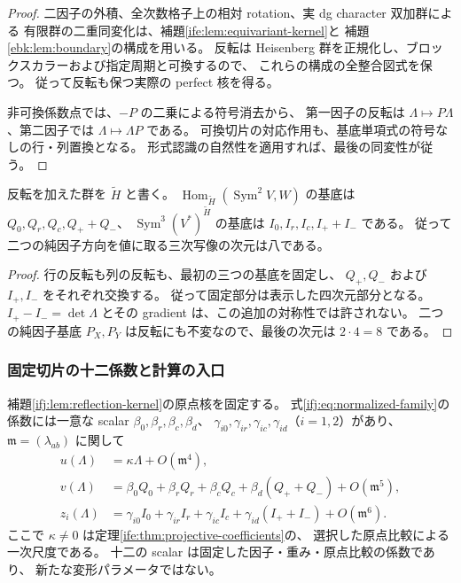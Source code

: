 \begin{proof}
二因子の外積、全次数格子上の相対 rotation、実 dg character 双加群による
有限群の二重同変化は、補題\ref{ife:lem:equivariant-kernel}と
補題\ref{ebk:lem:boundary}の構成を用いる。
反転は Heisenberg 群を正規化し、ブロックスカラーおよび指定周期と可換するので、
これらの構成の全整合図式を保つ。
従って反転も保つ実際の perfect 核を得る。

非可換係数点では、$-P$ の二乗による符号消去から、
第一因子の反転は $\Lambda\mapsto P\Lambda$、第二因子では
$\Lambda\mapsto\Lambda P$ である。
可換切片の対応作用も、基底単項式の符号なしの行・列置換となる。
形式認識の自然性を適用すれば、最後の同変性が従う。
\end{proof}

\begin{corollary}[四つの二次写像と四つの三次不変式への減少]
\label{ifj:cor:reflection-bases}
反転を加えた群を $\widetilde H$ と書く。
$\operatorname{Hom}_{\widetilde H}(\operatorname{Sym}^2V,W)$ の基底は
$Q_0,Q_r,Q_c,Q_++Q_-$、
$\operatorname{Sym}^3(V^*)^{\widetilde H}$ の基底は
$I_0,I_r,I_c,I_++I_-$ である。
従って二つの純因子方向を値に取る三次写像の次元は八である。
\end{corollary}

\begin{proof}
行の反転も列の反転も、最初の三つの基底を固定し、
$Q_+,Q_-$ および $I_+,I_-$ をそれぞれ交換する。
従って固定部分は表示した四次元部分となる。
$I_+-I_-=\det\Lambda$ とその gradient は、この追加の対称性では許されない。
二つの純因子基底 $P_X,P_Y$ は反転にも不変なので、最後の次元は $2\cdot4=8$ である。
\end{proof}

\subsubsection{固定切片の十二係数と計算の入口}

\begin{theorem}[二次・三次係数の有限還元]
\label{ifj:thm:twelve-coefficients}
補題\ref{ifj:lem:reflection-kernel}の原点核を固定する。
式\eqref{ifj:eq:normalized-family}の係数には一意な scalar
$\beta_0,\beta_r,\beta_c,\beta_d$、
$\gamma_{i0},\gamma_{ir},\gamma_{ic},\gamma_{id}$（$i=1,2$）があり、
$\mathfrak m=(\lambda_{ab})$ に関して
\begin{equation}\label{ifj:eq:twelve-coefficients}
 \begin{split}
 u(\Lambda)&=\kappa\Lambda+O(\mathfrak m^4),\\
 v(\Lambda)&=\beta_0Q_0+\beta_rQ_r+\beta_cQ_c
                         +\beta_d(Q_++Q_-)+O(\mathfrak m^5),\\
 z_i(\Lambda)&=\gamma_{i0}I_0+\gamma_{ir}I_r+\gamma_{ic}I_c
                         +\gamma_{id}(I_++I_-)+O(\mathfrak m^6).
 \end{split}
\end{equation}
ここで $\kappa\ne0$ は定理\ref{ife:thm:projective-coefficients}の、
選択した原点比較による一次尺度である。
十二の scalar は固定した因子・重み・原点比較の係数であり、
新たな変形パラメータではない。
\end{theorem}

